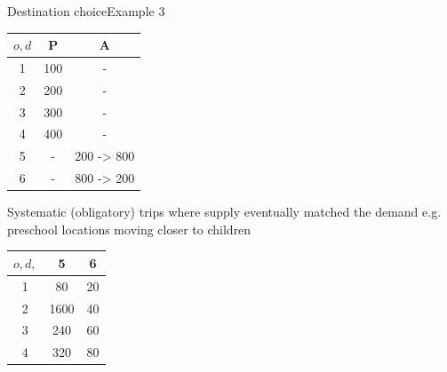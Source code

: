 \documentclass[8pt]{beamer}
\begin{document}
\begin{frame}{Destination choice}{Example 3}
\begin{center}
\begin{minipage}{0.65\textwidth}
        
    \end{minipage}\hfill
    \begin{minipage}{0.35\textwidth}
     \begin{center}
\begin{tabular}{|c|c|c|}
\hline 
{$o,d$} & P & A \\ 
\hline 
1 & 100 & -  \\ 
\hline 
2 & 200 & -  \\ 
\hline 
3 & 300 & -  \\ 
\hline 
4 & 400 & -    \\ 
\hline 
5 & - & 200 \alert{-> 800}  \\ 
\hline 
6 & - & 800 \alert{-> 200} \\ 
\hline
\end{tabular}
\end{center}   
    \end{minipage}
\end{center}
\begin{block}{Systematic (obligatory) trips where supply eventually matched the demand} 
e.g. preschool locations moving closer to children
\end{block}
\begin{center}
\begin{tabular}{|c|c|c|}
\hline 
{$o,d,$}& 5 & 6 \\ 
\hline 
1 & 80 & 20  \\ 
\hline 
2 & 1600 & 40 \\ 
\hline 
3 & 240 & 60 \\ 
\hline 
4 & 320 & 80 \\ 
\hline 
\end{tabular} 
\end{center}
\end{frame}
\end{document}
